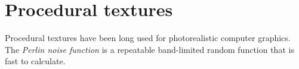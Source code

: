 \documentclass[twocolumn]{IV02}
\begin{document}
% 
% 
% 
% 
% 
%
%
%
%
%
%

%



%
%
%
%
%
%

\section{Procedural textures}


Procedural textures 
\cite{texturing-and-modeling,renderman-spec,advanced-renderman}
have been long used for photorealistic computer 
graphics. 
The \emph{Perlin noise function} 
is a repeatable band-limited random function that is fast to calculate.
\end{document}
